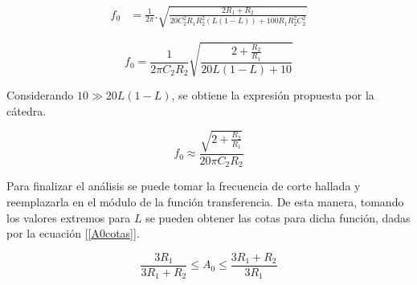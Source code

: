 \vspace{2mm}
\begin{align}
		f_0 &= \frac{1}{2\pi} . \sqrt{ \frac{2R_1 + R_2 }{ 20 C_2^2 R_1 R_2^2 (L (1-L)) + 100R_1 R_2^2C_2^2 } }
\end{align}
\vspace{2mm}


\begin{equation}
	f_0 = \frac{1}{2\pi C_2 R_2} \sqrt{ \frac{2 + \frac{R_2}{R_1} }{ 20L(1-L) + 10 } }	
	\label{f0sinsimplificar}
\end{equation}
\vspace{3mm}

Considerando $10 \gg 20L(1-L)$, se obtiene la expresión propuesta por la cátedra.

\vspace{2mm}
\begin{equation}
		f_0 \approx \frac{ \sqrt{ 2 + \frac{R_2}{R_1} } }{ 20\pi C_2 R_2 }
		\label{f0final}
\end{equation}
\vspace{2mm}

Para finalizar el análisis se puede tomar la frecuencia de corte hallada 
y reemplazarla en el módulo de la función transferencia. De esta manera, 
tomando los valores extremos para $L$ se pueden obtener 
 las cotas para dicha función, 
dadas por la ecuación [\ref{A0cotas}].

\vspace{2mm}
\begin{equation}
		\frac{3R_1}{3R_1+R_2} \leq  A_0 \leq\frac{3R_1+R_2}{3R_1}
		\label{A0cotas}
\end{equation}
\vspace{2mm}


